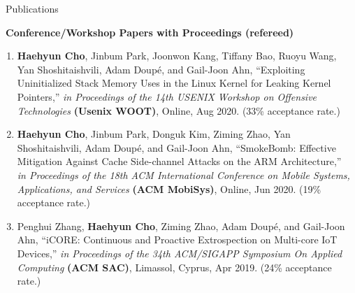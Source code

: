\documentclass{resume} %
\begin{document}

\begin{rSection}{\faGenderless~Publications}

    \strut\textbullet~{\bf Conference/Workshop Papers with Proceedings (refereed)}
    \begin{enumerate}[leftmargin=0pt]


        \item \textbf{Haehyun Cho}, Jinbum Park, Joonwon Kang, Tiffany Bao, Ruoyu Wang, Yan Shoshitaishvili, Adam Doup\'e, and Gail-Joon Ahn,
        ``Exploiting Uninitialized Stack Memory Uses in the Linux Kernel for Leaking Kernel Pointers,''
        \emph{in Proceedings of the 14th USENIX Workshop on Offensive Technologies} \textbf{(Usenix WOOT)},
        Online, Aug 2020.
        (33\% acceptance rate.)

        \item \textbf{Haehyun Cho}, Jinbum Park, Donguk Kim, Ziming Zhao, Yan Shoshitaishvili, Adam Doup\'e, and Gail-Joon Ahn,
		``SmokeBomb: Effective Mitigation Against Cache Side-channel Attacks on the ARM Architecture,'' 
        \emph{in Proceedings of the 18th ACM International Conference on Mobile Systems, Applications, and Services} \textbf{(ACM MobiSys)}, 
		Online, Jun 2020.
		(19\% acceptance rate.)

		\item Penghui Zhang, \textbf{Haehyun Cho}, Ziming Zhao, Adam Doup\'e, and Gail-Joon Ahn,
		``iCORE: Continuous and Proactive Extrospection on Multi-core IoT Devices,'' 
        \emph{in Proceedings of the 34th ACM/SIGAPP Symposium On Applied Computing} \textbf{(ACM SAC)}, 
		Limassol, Cyprus, Apr 2019.
		(24\% acceptance rate.)
     

\end{enumerate}
\end{rSection}
\end{document}
